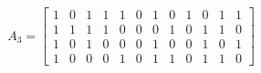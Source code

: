 \documentclass[a4paper]{article}
\theoremstyle{remark}
\begin{document}
\setcounter{MaxMatrixCols}{12}
\[
A_3 =
  \begin{bmatrix}
    1 & 0 & 1 & 1 & 1 & 0 & 1 & 0 & 1 & 0 & 1 & 1 \\
    1 & 1 & 1 & 1 & 0 & 0 & 0 & 1 & 0 & 1 & 1 & 0 \\
    1 & 0 & 1 & 0 & 0 & 0 & 1 & 0 & 0 & 1 & 0 & 1 \\
    1 & 0 & 0 & 0 & 1 & 0 & 1 & 1 & 0 & 1 & 1 & 0
\end{bmatrix}
\]


\newpage
\printbibliography
\end{document}
